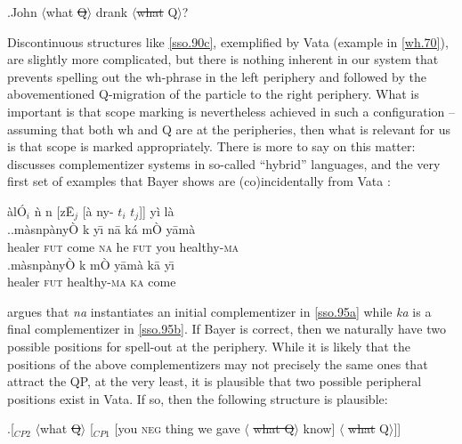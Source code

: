 \documentclass{glossa}
\begin{document}
\ex.\label{sso.94}John $\langle$what \sout{Q}$\rangle$ drank $\langle$\sout{what } Q$\rangle$?

Discontinuous structures like \ref{sso.90c}, exemplified by Vata (example in \ref{wh.70}), are slightly more complicated, but there is nothing inherent in our system that prevents spelling out the wh-phrase in the left periphery and followed by the abovementioned Q-migration of the particle to the right periphery. What is important is that scope marking is nevertheless achieved in such a configuration -- assuming that both wh and Q are at the peripheries, then what is relevant for us is that scope is marked appropriately. There is more to say on this matter: \cite{bayer:1999} discusses complementizer systems in so-called ``hybrid'' languages, and the very first set of examples that Bayer shows are (co)incidentally from Vata \citep{koopman:1984}:

\`al\'O$_i$ \`n n{} [z\={E}$_j$ [\`a ny{}-{} $t_i$ $t_j$]] y\`i l\`a\\

\ex.\ag.\label{sso.95a}m\`asn{}p\`any\`O k{} y\={\i} n\=a {} k\'a m\`O y\=am\`a\\
   healer \textsc{fut} come \textsc{na} he \textsc{fut} you healthy-\textsc{ma} \\
    \bg.\label{sso.95b}m\`asn{}p\`any\`O k{} m\`O y\=am\`a k\=a y\={\i} \\
   healer \textsc{fut} healthy-\textsc{ma} \textsc{ka} come \\

\cite{bayer:1999} argues that \textit{na} instantiates an initial complementizer in \ref{sso.95a} while \textit{ka} is a final complementizer in \ref{sso.95b}. If Bayer is correct, then we naturally have two possible positions for spell-out at the periphery. While it is likely that the positions of the above complementizers may not precisely the same ones that attract the QP, at the very least, it is plausible that two possible peripheral positions exist in Vata. If so, then the following structure is plausible:

\ex.\label{sso.96}[$_{CP2}$ $\langle$what \sout{Q}$\rangle$ [$_{CP1}$ [you \textsc{neg} thing we gave $\langle$ \sout{what Q}$\rangle$ know] $\langle$ \sout{what} Q$\rangle$]]
\end{document}

